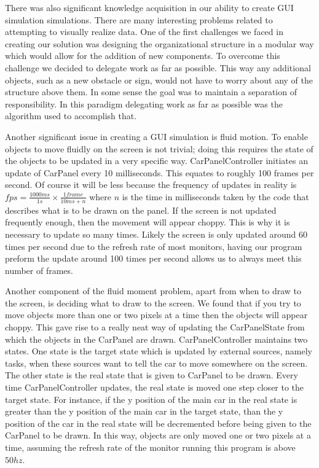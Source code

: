 \documentclass{article} %
\begin{document}

There was also significant knowledge acquisition in our ability to create GUI simulation simulations.
There are many interesting problems related to attempting to visually realize data.
One of the first challenges we faced in creating our solution was designing the organizational structure in a modular way which would allow for the addition of new components.
To overcome this challenge we decided to delegate work as far as possible.
This way any additional objects, such as a new obstacle or sign, would not have to worry about any of the structure above them.
In some sense the goal was to maintain a separation of responsibility. In this paradigm delegating work as far as possible was the algorithm used to accomplish that.

Another significant issue in creating a GUI simulation is fluid motion.
To enable objects to move fluidly on the screen is not trivial; doing this requires the state of the objects to be updated in a very specific way.
CarPanelController initiates an update of CarPanel every 10 milliseconds. This equates to roughly 100 frames per second. Of course it will be less because the frequency of updates in reality is $fps = \frac{1000 ms}{1 s} \times \frac{1 frame}{10ms + n}$ where $n$ is the time in milliseconds taken by the code that describes what is to be drawn on the panel.
If the screen is not updated frequently enough, then the movement will appear choppy.
This is why it is necessary to update so many times. Likely the screen is only updated around 60 times per second due to the refresh rate of most monitors, having our program preform the update around 100 times per second allows us to always meet this number of frames.

Another component of the fluid moment problem, apart from when to draw to the screen, is deciding what to draw to the screen.
We found that if you try to move objects more than one or two pixels at a time then the objects will appear choppy.
This gave rise to a really neat way of updating the CarPanelState from which the objects in the CarPanel are drawn.
CarPanelController maintains two states. 
One state is the target state which is updated by external sources, namely tasks, when these sources want to tell the car to move somewhere on the screen.
The other state is the real state that is given to CarPanel to be drawn.
Every time CarPanelController updates, the real state is moved one step closer to the target state.
For instance, 
if the y position of the main car in the real state is greater than the y position of the main car in the target state, 
than the y position of the car in the real state will be decremented before being given to the CarPanel to be drawn.
In this way, objects are only moved one or two pixels at a time, assuming the refresh rate of the monitor running this program is above $50hz$.
\end{document}
